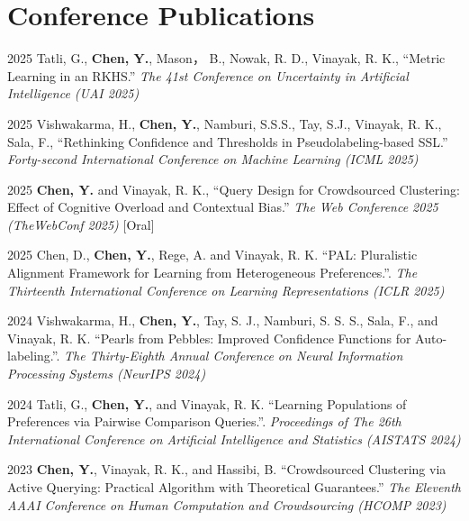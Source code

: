 \documentclass[11pt,letterpaper]{report}
\begin{document}
    \section*{Conference Publications}
    
    \begin{tablist}

        \item[2025]  \tab{} Tatli, G., \textbf{Chen, Y.}, Mason， B., Nowak, R. D., Vinayak, R. K., \enquote{Metric Learning in an RKHS.}  \textit{The 41st Conference on Uncertainty in Artificial Intelligence (UAI 2025)}
        
        \item[2025]  \tab{} Vishwakarma, H., \textbf{Chen, Y.}, Namburi, S.S.S., Tay, S.J., Vinayak, R. K., Sala, F., \enquote{Rethinking Confidence and Thresholds in Pseudolabeling-based SSL.}  \textit{Forty-second International Conference on Machine Learning (ICML 2025)}


        \item[2025]  \tab{} \textbf{Chen, Y.} and Vinayak, R. K., \enquote{Query Design for Crowdsourced Clustering: Effect of Cognitive Overload and Contextual Bias.}  \textit{The Web Conference 2025 (TheWebConf 2025)} [Oral]
    
        \item[2025] \tab{}Chen, D., \textbf{Chen, Y.}, Rege, A. and Vinayak, R. K. \enquote{PAL: Pluralistic Alignment Framework for Learning from Heterogeneous Preferences.}. \textit{The Thirteenth International Conference on Learning Representations (ICLR 2025)} 
        
        \item[2024] \tab{}Vishwakarma, H., \textbf{Chen, Y.}, Tay, S. J., Namburi, S. S. S., Sala, F., and Vinayak, R. K. \enquote{Pearls from Pebbles: Improved Confidence Functions for Auto-labeling.}. \textit{The Thirty-Eighth Annual Conference on Neural Information Processing Systems (NeurIPS 2024)}

        \item[2024] \tab{}Tatli, G., \textbf{Chen, Y.}, and Vinayak, R. K. \enquote{Learning Populations of Preferences via Pairwise Comparison Queries.}. \textit{Proceedings of The 26th International Conference on Artificial Intelligence and Statistics (AISTATS 2024)}

        \item[2023] \tab{}\textbf{Chen, Y.}, Vinayak, R. K., and Hassibi, B. \enquote{Crowdsourced Clustering via Active Querying: Practical Algorithm with Theoretical Guarantees.} \textit{The Eleventh AAAI Conference on Human Computation and Crowdsourcing (HCOMP 2023)}

    \end{tablist}
\end{document}
